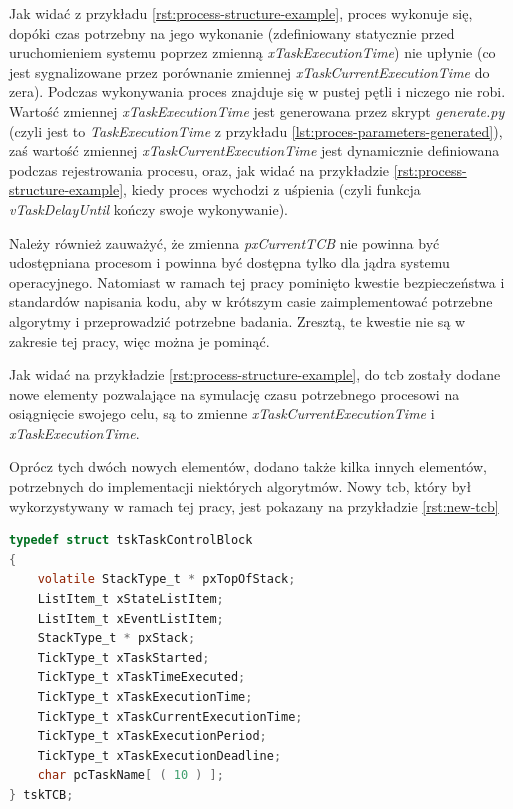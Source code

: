\documentclass[../../main]{subfiles}
\begin{document}
Jak widać z przykładu \ref{rst:process-structure-example}, proces wykonuje się, dopóki czas potrzebny na jego wykonanie (zdefiniowany statycznie przed uruchomieniem systemu poprzez zmienną \textit{xTaskExecutionTime}) nie upłynie (co jest sygnalizowane przez porównanie zmiennej \textit{xTaskCurrentExecutionTime} do zera). Podczas wykonywania proces znajduje się w pustej pętli i niczego nie robi. Wartość zmiennej \textit{xTaskExecutionTime} jest generowana przez skrypt \textit{generate.py} (czyli jest to \textit{TaskExecutionTime} z przykładu \ref{lst:proces-parameters-generated}), zaś wartość zmiennej \textit{xTaskCurrentExecutionTime} jest dynamicznie definiowana podczas rejestrowania procesu, oraz, jak widać na przykładzie \ref{rst:process-structure-example}, kiedy proces wychodzi z uśpienia (czyli funkcja \textit{vTaskDelayUntil} kończy swoje wykonywanie).

Należy również zauważyć, że zmienna \textit{pxCurrentTCB} nie powinna być udostępniana procesom i powinna być dostępna tylko dla jądra systemu operacyjnego. Natomiast w ramach tej pracy pominięto kwestie bezpieczeństwa i standardów napisania kodu, aby w krótszym casie zaimplementować potrzebne algorytmy i przeprowadzić potrzebne badania. Zresztą, te kwestie nie są w zakresie tej pracy, więc można je pominąć.

Jak widać na przykładzie \ref{rst:process-structure-example}, do \acrshort{tcb} zostały dodane nowe elementy pozwalające na symulację czasu potrzebnego procesowi na osiągnięcie swojego celu, są to zmienne \textit{xTaskCurrentExecutionTime} i \textit{xTaskExecutionTime}.

Oprócz tych dwóch nowych elementów, dodano także kilka innych elementów, potrzebnych do implementacji niektórych algorytmów. Nowy \acrshort{tcb}, który był wykorzystywany w ramach tej pracy, jest pokazany na przykładzie \ref{rst:new-tcb}

\begin{lstlisting}[language=C, label={rst:new-tcb}, caption={Zmodyfikowany \acrshort{tcb}}]
typedef struct tskTaskControlBlock
{
    volatile StackType_t * pxTopOfStack;
    ListItem_t xStateListItem;
    ListItem_t xEventListItem;
    StackType_t * pxStack;
    TickType_t xTaskStarted;
    TickType_t xTaskTimeExecuted;
    TickType_t xTaskExecutionTime;
    TickType_t xTaskCurrentExecutionTime;
    TickType_t xTaskExecutionPeriod;
    TickType_t xTaskExecutionDeadline;
    char pcTaskName[ ( 10 ) ];
} tskTCB;
\end{lstlisting}
\end{document}
